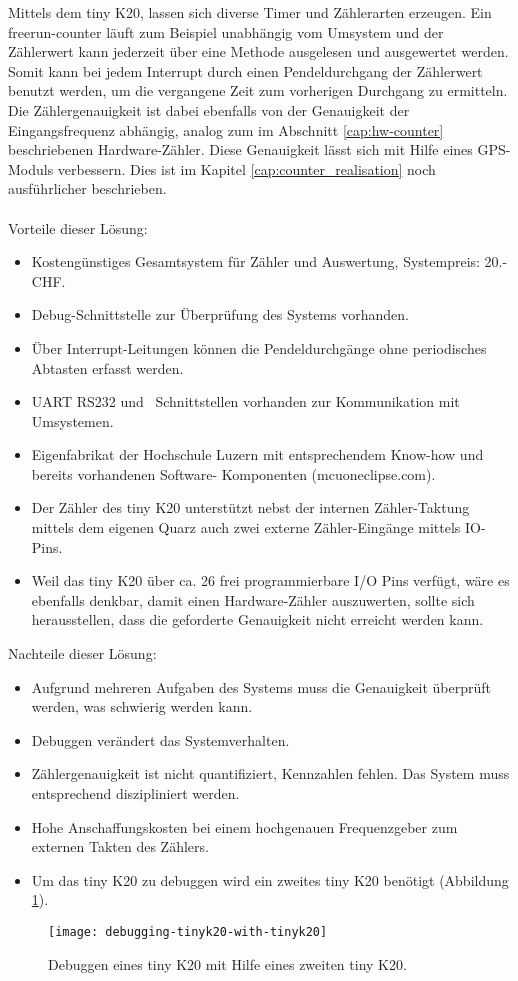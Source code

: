     	\noindent Mittels dem tiny K20, lassen sich diverse Timer und Zählerarten erzeugen. Ein \glqq{}freerun-counter\grqq{} läuft zum Beispiel unabhängig vom Umsystem und der Zählerwert kann jederzeit über eine Methode ausgelesen und ausgewertet werden. Somit kann bei jedem Interrupt durch einen Pendeldurchgang der Zählerwert benutzt werden, um die vergangene Zeit zum vorherigen Durchgang zu ermitteln. 
    	Die Zählergenauigkeit ist dabei ebenfalls von der Genauigkeit der Eingangsfrequenz abhängig, analog zum im Abschnitt \ref{cap:hw-counter} beschriebenen Hardware-Zähler. Diese Genauigkeit lässt sich mit Hilfe eines GPS-Moduls verbessern. Dies ist im Kapitel \ref{cap:counter_realisation} noch ausführlicher beschrieben.\\
        \\
    	Vorteile dieser Lösung:
    	\begin{itemize}
    		\item Kostengünstiges Gesamtsystem für Zähler und Auswertung, Systempreis: 20.- CHF.
    		\item Debug-Schnittstelle zur Überprüfung des Systems vorhanden.
    		\item Über Interrupt-Leitungen können die Pendeldurchgänge ohne periodisches Abtasten erfasst werden.
    		\item UART RS232 und \iic\ Schnittstellen vorhanden zur Kommunikation mit Umsystemen.
    		\item Eigenfabrikat der Hochschule Luzern mit entsprechendem Know-how und bereits vorhandenen Software- Komponenten (mcuoneclipse.com).
    		\item Der Zähler des tiny K20 unterstützt nebst der internen Zähler-Taktung mittels dem eigenen Quarz auch zwei externe Zähler-Eingänge mittels IO-Pins.
    		\item Weil das tiny K20 über ca. 26 frei programmierbare I/O Pins verfügt, wäre es ebenfalls denkbar, damit einen Hardware-Zähler auszuwerten, sollte sich herausstellen, dass die geforderte Genauigkeit nicht erreicht werden kann.
    	\end{itemize}
    	Nachteile dieser Lösung:
    	\begin{itemize}
    		\item Aufgrund mehreren Aufgaben des Systems muss die Genauigkeit überprüft werden, was schwierig werden kann.
    		\item Debuggen verändert das Systemverhalten.
    		\item Zählergenauigkeit ist nicht quantifiziert, Kennzahlen fehlen. Das System muss entsprechend diszipliniert werden.
    		\item Hohe Anschaffungskosten bei einem hochgenauen Frequenzgeber zum externen Takten des Zählers.
    		\item Um das tiny K20 zu debuggen wird ein zweites tiny K20 benötigt (Abbildung \ref{fig:dbg_tiny_tiny}).
    	\end{itemize}
	\begin{figure}[H]
		\centering
		\texttt{[image: debugging-tinyk20-with-tinyk20]}
		\caption{Debuggen eines tiny K20 mit Hilfe eines zweiten tiny K20.}
		\label{fig:dbg_tiny_tiny}
	\end{figure}		
